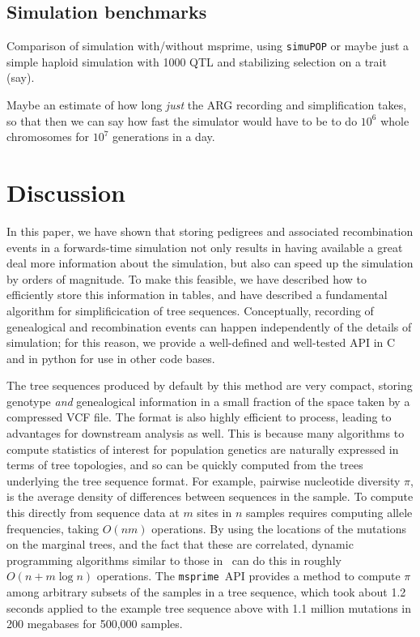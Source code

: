 \documentclass{article}
\newcommand{\simupop}{\texttt{simuPOP}}
\newcommand{\msprime}{\texttt{msprime}}
\begin{document}
\subsection*{Simulation benchmarks}

Comparison of simulation with/without msprime, using \simupop{}
or maybe just a simple haploid simulation with 1000 QTL and stabilizing selection on a trait (say).

Maybe an estimate of how long \emph{just} the ARG recording and simplification takes,
so that then we can say how fast the simulator would have to be to do $10^6$ whole chromosomes for $10^7$ generations
in a day.


\section*{Discussion}

In this paper, we have shown that storing pedigrees
and associated recombination events
in a forwards-time simulation
not only results in having available a great deal more information about the simulation,
but also can speed up the simulation by orders of magnitude.
To make this feasible,
we have described how to efficiently store this information in tables,
and have described a fundamental algorithm for simplificication of tree sequences.
Conceptually, recording of genealogical and recombination events
can happen independently of the details of simulation;
for this reason, we provide a well-defined and well-tested API in C and in python
for use in other code bases.

The tree sequences produced by default by this method
are very compact, storing genotype \emph{and} genealogical information
in a small fraction of the space taken by a compressed VCF file.
The format is also highly efficient to process,
leading to advantages for downstream analysis as well.
This is because many algorithms to compute statistics of interest for population genetics
are naturally expressed in terms of tree topologies,
and so can be quickly computed from the trees underlying the tree sequence format.
For example, pairwise nucleotide diversity $\pi$, is the average density of
differences between sequences in the sample.
To compute this directly from sequence data at $m$ sites in $n$ samples
requires computing allele frequencies, taking $O(nm)$ operations.
By using the locations of the mutations on the marginal trees,
and the fact that these are correlated,
dynamic programming algorithms similar to those in~\citep{kelleher2016efficient}
can do this in roughly $O(n + m \log n)$ operations.
The \msprime\ API provides a method to compute $\pi$ among arbitrary subsets of the
samples in a tree sequence, which took about 1.2 seconds
applied to the example tree sequence above with 1.1 million mutations
in 200 megabases for 500,000 samples.
\end{document}
